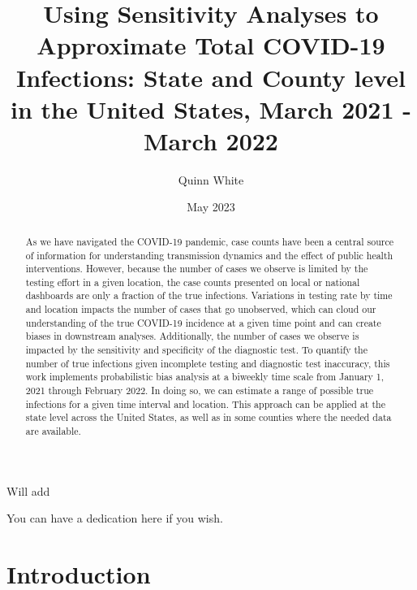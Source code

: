 \documentclass[12pt,twoside]{smiththesis}
\title{Using Sensitivity Analyses to Approximate Total COVID-19 Infections: State and County level in the United States, March 2021 - March 2022}
\author{Quinn White}
\date{May 2023}
\begin{document}
  \maketitle

\frontmatter %
\pagestyle{empty} %
  \begin{acknowledgements}
    Will add
  \end{acknowledgements}

  {
    \hypersetup{linkcolor=black}
    \setcounter{tocdepth}{2}
    \tableofcontents
  }


  \begin{abstract}
    As we have navigated the COVID-19 pandemic, case counts have been a central source of information for understanding transmission dynamics and the effect of public health interventions. However, because the number of cases we observe is limited by the testing effort in a given location, the case counts presented on local or national dashboards are only a fraction of the true infections. Variations in testing rate by time and location impacts the number of cases that go unobserved, which can cloud our understanding of the true COVID-19 incidence at a given time point and can create biases in downstream analyses. Additionally, the number of cases we observe is impacted by the sensitivity and specificity of the diagnostic test. To quantify the number of true infections given incomplete testing and diagnostic test inaccuracy, this work implements probabilistic bias analysis at a biweekly time scale from January 1, 2021 through February 2022. In doing so, we can estimate a range of possible true infections for a given time interval and location. This approach can be applied at the state level across the United States, as well as in some counties where the needed data are available.
  \end{abstract}
  \begin{dedication}
    You can have a dedication here if you wish.
  \end{dedication}
\mainmatter %
\pagestyle{fancyplain} %

\hypertarget{introduction}{%
\chapter{Introduction}\label{introduction}}
\end{document}

